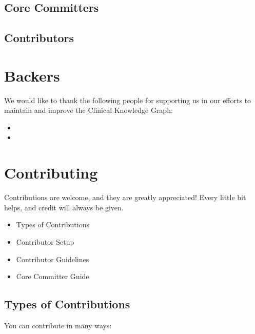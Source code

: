 \documentclass[letterpaper,10pt,english]{sphinxmanual}
\begin{document}
\subsection{Core Committers}
\label{\detokenize{MANIFEST:core-committers}}

\subsection{Contributors}
\label{\detokenize{MANIFEST:contributors}}

\section{Backers}
\label{\detokenize{MANIFEST:backers}}
We would like to thank the following people for supporting us in our efforts to maintain and improve the Clinical Knowledge Graph:
\begin{itemize}
\item {} 
\item {} 
\end{itemize}


\section{Contributing}
\label{\detokenize{MANIFEST:contributing}}
Contributions are welcome, and they are greatly appreciated! Every little bit helps, and credit will always be given.
\begin{itemize}
\item {} 
Types of Contributions {\hyperref[\detokenize{MANIFEST:types-of-contributions}]{}}

\item {} 
Contributor Setup {\hyperref[\detokenize{MANIFEST:setting-up-the-code-for-local-development}]{}}

\item {} 
Contributor Guidelines {\hyperref[\detokenize{MANIFEST:contributor-guidelines}]{}}

\item {} 
Core Committer Guide {\hyperref[\detokenize{MANIFEST:core-committer-guide}]{}}

\end{itemize}


\subsection{Types of Contributions}
\label{\detokenize{MANIFEST:types-of-contributions}}
You can contribute in many ways:
\end{document}
